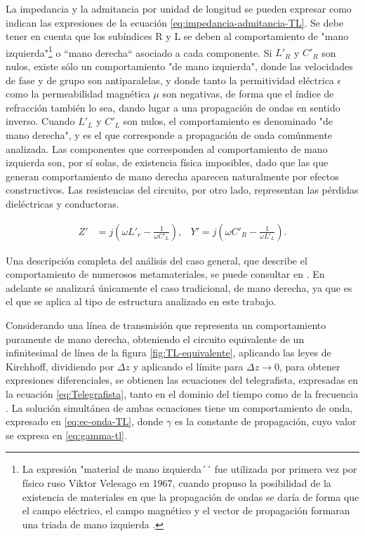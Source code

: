 La impedancia y la admitancia por unidad de longitud se pueden expresar como indican las expresiones de la ecuación \ref{eq:impedancia-admitancia-TL}. Se debe tener en cuenta que los subíndices R y L se deben al comportamiento de "mano izquierda"\footnote{La expresión "material de mano izquierda´´ fue utilizada por primera vez por físico ruso Viktor Velesago en 1967, cuando propuso la posibilidad de la existencia de materiales en que la propagación de ondas se daría de forma que el campo eléctrico, el campo magnético y el vector de propagación formaran una triada de mano izquierda \cite{Caloz:ElectromagneticMetamaterials}.} o ``mano derecha`` asociado a cada componente. Si $L'_R$ y $C'_R$ son nulos, existe sólo un comportamiento "de mano izquierda", donde las velocidades de fase y de grupo son antiparalelas, y donde tanto la permitividad eléctrica $\epsilon$ como la permeabilidad magnética $\mu$ son negativas, de forma que el índice de refracción también lo sea, dando lugar a una propagación de ondas en sentido inverso. Cuando $L'_L$ y $C'_L$ son nulos, el comportamiento es denominado "de mano derecha", y es el que corresponde a propagación de onda comúnmente analizada. Las componentes que corresponden al comportamiento de mano izquierda son, por sí solas, de existencia física imposibles, dado que las que generan comportamiento de mano derecha aparecen naturalmente por efectos constructivos. Las resistencias del circuito, por otro lado, representan las pérdidas dieléctricas y conductoras.


\begin{align}
\label{eq:impedancia-admitancia-TL}
Z' &= j \left(\omega L'_r - \frac{1}{\omega C'_L} \right), & Y' =j \left(\omega C'_R - \frac{1}{\omega L'_L} \right).
\end{align}

Una descripción completa del análisis del caso general, que describe el comportamiento de numerosos metamateriales, se puede consultar en \cite{Caloz:ElectromagneticMetamaterials}. En adelante se analizará únicamente el caso tradicional, de mano derecha, ya que es el que se aplica al tipo de estructura analizado en este trabajo.

Considerando una línea de transmisión que representa un comportamiento puramente de mano derecha, obteniendo el circuito equivalente de un infinitesimal de línea de la figura \ref{fig:TL-equivalente}, aplicando las leyes de Kirchhoff, dividiendo por $\Delta z$ y aplicando el límite para $\Delta z \rightarrow 0$, para obtener expresiones diferenciales, se obtienen las ecuaciones del telegrafista, expresadas en la ecuación \ref{eq:Telegrafista}, tanto en el dominio del tiempo como de la frecuencia \cite{Fernandez:Electromag}. La solución simultánea de ambas ecuaciones tiene un comportamiento de onda, expresado en \ref{eq:ec-onda-TL}, donde $\gamma$ es la constante de propagación, cuyo valor se expresa en \ref{eq:gamma-tl}.

